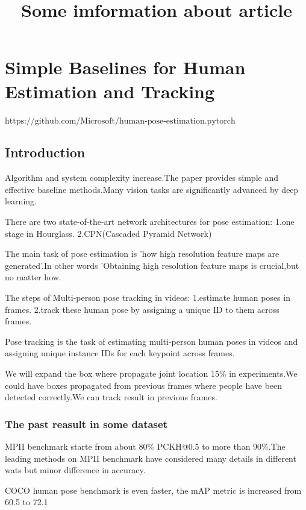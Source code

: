\documentclass[11pt]{article}
\begin{document}
	\title{Some imformation about article}
	
	\maketitle
	
	\newpage
	\tableofcontents
	\newpage

\section{Simple Baselines for Human Estimation and Tracking}
$\text{https://github.com/Microsoft/human-pose-estimation.pytorch}$
\subsection{Introduction}

Algorithm and system complexity increase.The paper provides simple and effective baseline methods.Many vision tasks are significantly advanced by deep learning.

There are two state-of-the-art network architectures for pose estimation:
1.one stage in Hourglass.
2.CPN(Cascaded Pyramid Network)

The main task of pose estimation is 'how high resolution feature maps are generated'.In other words 'Obtaining high resolution feature maps is crucial,but no matter how.

The steps of Multi-person pose tracking in videos:
1.estimate human poses in frames.
2.track these human pose by assigning a unique ID to them across frames.

Pose tracking is the task of estimating multi-person human poses in videos and assigning unique instance IDs for each keypoint across frames.

We will expand the box where propagate joint location 15\% in experiments.We could have boxes propagated from previous frames where people have been detected correctly.We can track result in previous frames.


\subsubsection{The past reasult in some dataset}

MPII benchmark starte from about 80\% PCKH@0.5 to more than 90\%.The leading methods on MPII benchmark have considered many details in different wats but minor difference in accuracy.

COCO human pose benchmark is even faster, the mAP metric is increased from 60.5 to 72.1
\end{document}
